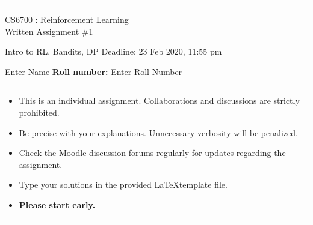 \documentclass[addpoints,12pt,solution]{exam}
\begin{document}
\hrule
\vspace{1mm}
\noindent 
\begin{center}
{\Large CS6700 : Reinforcement Learning} \\
{\large Written Assignment \#1}
\end{center}
\vspace{1mm}
\noindent 
{\large Intro to RL, Bandits, DP   \hfill Deadline: 23 Feb 2020, 11:55 pm}


 Enter Name \hfill {\bf Roll number:} Enter Roll Number
\vspace{2mm}
\hrule

{\small

\begin{itemize}\itemsep0mm
\item This is an individual assignment. Collaborations and discussions are strictly
prohibited.
\item Be precise with your explanations. Unnecessary verbosity will be penalized.
\item Check the Moodle discussion forums regularly for updates regarding the assignment.
\item Type your solutions in the provided \LaTeX template file.
\item \textbf{Please start early.}
\end{itemize}
}

\hrule

\vspace{3mm}




\end{document}
